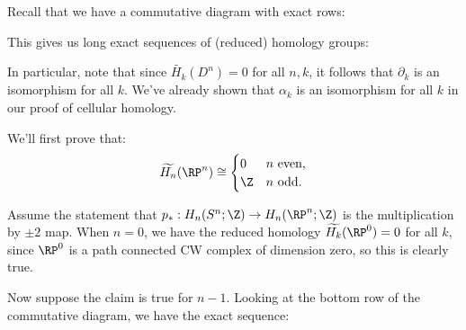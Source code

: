 \documentclass[11pt,letterpaper]{article}
\begin{document}
\begin{solution}
    \quad Recall that we have a commutative diagram with exact rows:
    \begin{center}
    \end{center}
    This gives us long exact sequences of (reduced) homology groups:
    \begin{center}
    \end{center}
    In particular, note that since $\widetilde{H_k}(D^n)=0$ for all $n,k$, it follows that $\partial_k$ is an isomorphism for all $k$. We've already shown that $\alpha_k$ is an isomorphism for all $k$ in our proof of cellular homology.

    \quad We'll first prove that:
    \[
        \widetilde{H_n}(\RP^n) \cong \begin{cases}
            0 & n\text{ even},\\
            \Z & n\text{ odd}.    
        \end{cases}
    \] 

    \quad Assume the statement that $p_* : H_n(S^n; \Z) \to H_n(\RP^n; \Z)$ is the multiplication by $\pm 2$ map. When $n=0$, we have the reduced homology $\widetilde{H_k}(\RP^0)=0$ for all $k$, since $\RP^0$ is a path connected CW complex of dimension zero, so this is clearly true. 
    
    \quad Now suppose the claim is true for $n-1$. Looking at the bottom row of the commutative diagram, we have the exact sequence:


\end{solution}
\end{document}
